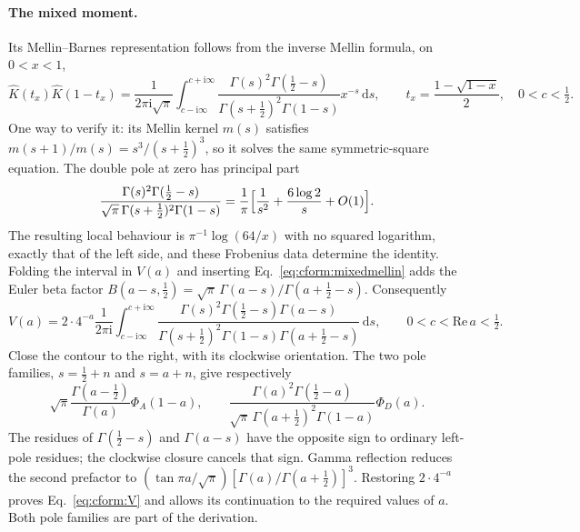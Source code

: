 \documentclass[11pt,a4paper]{article}
\numberwithin{equation}{section}
\newcommand{\dd}{\,\mathrm d}
\begin{document}
\paragraph{The mixed moment.} Its Mellin--Barnes representation follows from the inverse Mellin formula, on $0<x<1$,
\begin{equation}
 \hat K(t_x)\hat K(1-t_x)=\frac1{2\pi\mathrm i\sqrt\pi}\int_{c-\mathrm i\infty}^{c+\mathrm i\infty}
 \frac{\Gamma(s)^2\Gamma(\frac12-s)}{\Gamma(s+\frac12)^2\Gamma(1-s)}x^{-s}\dd s,\qquad
 t_x=\frac{1-\sqrt{1-x}}2,\quad0<c<\tfrac12.
 \label{eq:cform:mixedmellin}
\end{equation}
One way to verify it: its Mellin kernel $m(s)$ satisfies $m(s+1)/m(s)=s^3/(s+\frac12)^3$, so it solves the same
symmetric-square equation. The double pole at zero has principal part
\begin{equation}
 \frac{\Gamma(s)^2\Gamma(\frac12-s)}{\sqrt\pi\,\Gamma(s+\frac12)^2\Gamma(1-s)}
 =\frac1\pi\Bigl[\frac1{s^2}+\frac{6\log2}{s}+O(1)\Bigr].
\end{equation}
The resulting local behaviour is $\pi^{-1}\log(64/x)$ with no squared logarithm, exactly that of the left side, and
these Frobenius data determine the identity. Folding the interval in $V(a)$ and inserting
Eq.~\eqref{eq:cform:mixedmellin} adds the Euler beta factor $B(a-s,\frac12)=\sqrt\pi\,\Gamma(a-s)/\Gamma(a+\frac12-s)$.
Consequently
\begin{equation}
 V(a)=2\cdot4^{-a}\frac1{2\pi\mathrm i}\int_{c-\mathrm i\infty}^{c+\mathrm i\infty}
 \frac{\Gamma(s)^2\Gamma(\frac12-s)\Gamma(a-s)}{\Gamma(s+\frac12)^2\Gamma(1-s)\Gamma(a+\frac12-s)}\dd s,\qquad
 0<c<\mathrm{Re}\,a<\tfrac12.
\end{equation}
Close the contour to the right, with its clockwise orientation. The two pole families, $s=\frac12+n$ and $s=a+n$, give
respectively
\begin{equation}
 \sqrt\pi\frac{\Gamma(a-\frac12)}{\Gamma(a)}\Phi_A(1-a),\qquad
 \frac{\Gamma(a)^2\Gamma(\frac12-a)}{\sqrt\pi\,\Gamma(a+\frac12)^2\Gamma(1-a)}\Phi_D(a).
\end{equation}
The residues of $\Gamma(\frac12-s)$ and $\Gamma(a-s)$ have the opposite sign to ordinary left-pole residues; the
clockwise closure cancels that sign. Gamma reflection reduces the second prefactor to
$(\tan\pi a/\sqrt\pi)[\Gamma(a)/\Gamma(a+\frac12)]^3$. Restoring $2\cdot4^{-a}$ proves Eq.~\eqref{eq:cform:V} and
allows its continuation to the required values of $a$. Both pole families are part of the derivation.
\end{document}
